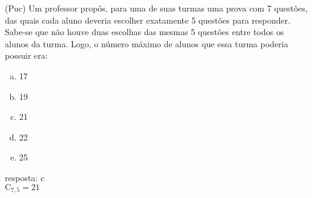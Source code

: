 \begin{ex}
 (Puc) Um professor propôs, para uma de suas turmas uma prova com 7 questões, das quais cada aluno deveria escolher exatamente 5 questões para responder. Sabe-se que não houve duas escolhas das mesmas 5 questões entre todos os alunos da turma. Logo, o número máximo de alunos que essa turma poderia possuir era:
    \begin{enumerate}[(a)]
    \item 17
    \item 19
    \item 21
    \item 22
    \item 25
    \end{enumerate}
     \begin{sol}
      resposta: c \\
      $\mathrm{C}_{7,5}=21$
     \end{sol}
\end{ex}